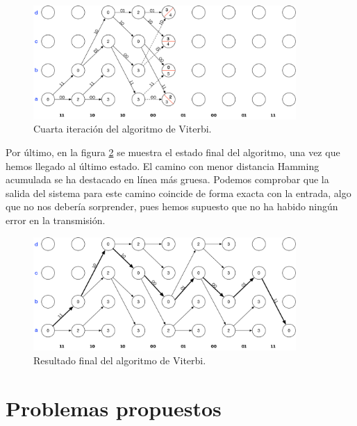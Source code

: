 \documentclass[es,apuntes]{uah}
\begin{document}
{\begin{figure}
	\centering\includegraphics[width=10cm]{./Figuras/Viterbi_4}
		\caption{Cuarta iteración del algoritmo de Viterbi.}	
		\label{fig:Viterbi_4}
\end{figure}

Por último, en la figura \ref{fig:Viterbi_5} se muestra el estado final del algoritmo, una vez que hemos llegado al último estado. El camino con menor distancia Hamming acumulada se ha destacado en línea más gruesa. Podemos comprobar que la salida del sistema para este camino coincide de forma exacta con la entrada, algo que no nos debería sorprender, pues hemos supuesto que no ha habido ningún error en la transmisión. 

\begin{figure}
	\centering\includegraphics[width=10cm]{./Figuras/Viterbi_5}
		\caption{Resultado final del algoritmo de Viterbi.}	
		\label{fig:Viterbi_5}
\end{figure}



\newpage

\section{Problemas propuestos}


	


}
\end{document}
